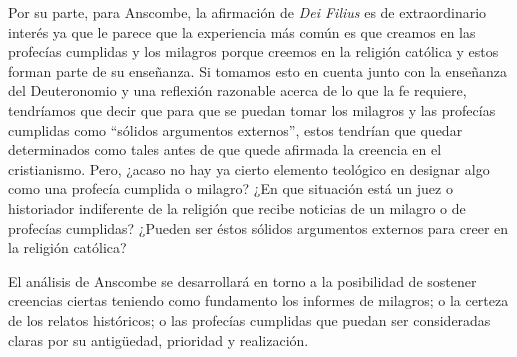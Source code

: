 Por su parte, para Anscombe, la afirmación de \emph{Dei Filius} es de
extraordinario interés ya que le parece que la experiencia más común es que
creamos en las profecías cumplidas y los milagros porque creemos en la religión
católica y estos forman parte de su enseñanza. Si tomamos esto en cuenta junto
con la enseñanza del Deuteronomio y una reflexión razonable acerca de lo que la
fe requiere, tendríamos que decir que para que se puedan tomar los milagros y
las profecías cumplidas como \enquote{sólidos argumentos externos}, estos
tendrían que quedar determinados como tales antes de que quede afirmada la
creencia en el cristianismo. Pero, ¿acaso no hay ya cierto elemento teológico en
designar algo como una profecía cumplida o milagro? ¿En que situación está un
juez o historiador indiferente de la religión que recibe noticias de un milagro
o de profecías cumplidas? ¿Pueden ser éstos sólidos argumentos externos para
creer en la religión católica?

El análisis de Anscombe se desarrollará en torno a la posibilidad de sostener
creencias ciertas teniendo como fundamento los informes de milagros; o la
certeza de los relatos históricos; o las profecías cumplidas que puedan ser
consideradas claras por su antigüedad, prioridad y realización.

